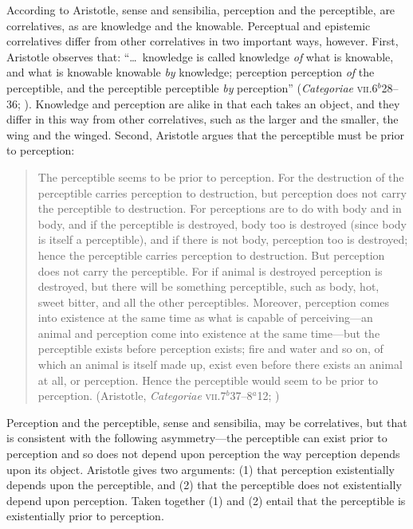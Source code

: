 According to Aristotle, sense and sensibilia, perception and the perceptible, are correlatives, as are knowledge and the knowable. Perceptual and epistemic correlatives differ from other correlatives in two important ways, however. First, Aristotle observes that: ``\ldots\ knowledge is called knowledge \emph{of} what is knowable, and what is knowable knowable \emph{by} knowledge; perception perception \emph{of} the perceptible, and the perceptible perceptible \emph{by} perception'' (\emph{Categoriae} \textsc{vii}.6\( ^{b} \)28--36; \citealt[18]{Ackrill:1963fk}). Knowledge and perception are alike in that each takes an object, and they differ in this way from other correlatives, such as the larger and the smaller, the wing and the winged. Second, Aristotle argues that the perceptible must be prior to perception:
\begin{quote}
    The perceptible seems to be prior to perception. For the destruction of the perceptible carries perception to destruction, but perception does not carry the perceptible to destruction. For perceptions are to do with body and in body, and if the perceptible is destroyed, body too is destroyed (since body is itself a perceptible), and if there is not body, perception too is destroyed; hence the perceptible carries perception to destruction. But perception does not carry the perceptible. For if animal is destroyed perception is destroyed, but there will be something perceptible, such as body, hot, sweet bitter, and all the other perceptibles. Moreover, perception comes into existence at the same time as what is capable of perceiving---an animal and perception come into existence at the same time---but the perceptible exists before perception exists; fire and water and so on, of which an animal is itself made up, exist even before there exists an animal at all, or perception. Hence the perceptible would seem to be prior to perception. (Aristotle, \emph{Categoriae} \textsc{vii}.7\( ^{b} \)37--8\( ^{a} \)12; \citealt[21--22]{Ackrill:1963fk})
\end{quote}
Perception and the perceptible, sense and sensibilia, may be correlatives, but that is consistent with the following asymmetry---the perceptible can exist prior to perception and so does not depend upon perception the way perception depends upon its object. Aristotle gives two arguments: (1) that perception existentially depends upon the perceptible, and (2) that the perceptible does not existentially depend upon perception. Taken together (1) and (2) entail that the perceptible is existentially prior to perception. 

